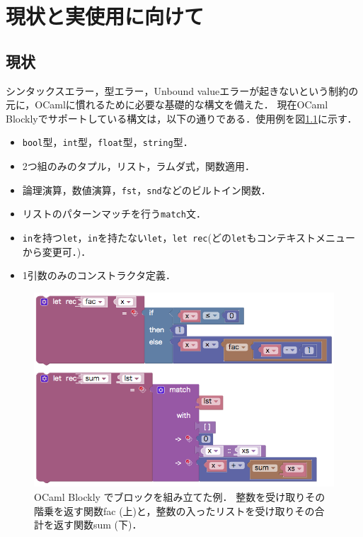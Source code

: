 \chapter {現状と実使用に向けて}\label{chap:todo}

\section {現状}\label{sub:genjo}

シンタックスエラー，型エラー，Unbound valueエラーが起きないという制約の元に，OCamlに慣れるために必要な基礎的な構文を備えた．
現在OCaml Blocklyでサポートしている構文は，以下の通りである．使用例を図\ref{fig:ocamlBlocks}に示す．
\begin{itemize}
  \item {\tt bool}型，{\tt int}型，{\tt float}型，{\tt string}型．
  \item 2つ組のみのタプル，リスト，ラムダ式，関数適用．
  \item 論理演算，数値演算，{\tt fst}，{\tt snd}などのビルトイン関数．
  \item リストのパターンマッチを行う{\tt match}文．
  \item {\tt in}を持つ{\tt let}，{\tt in}を持たない{\tt let}，{\tt let rec}(どの{\tt let}もコンテキストメニューから変更可．)．
  \item 1引数のみのコンストラクタ定義．
\end{itemize}

\begin{figure}[h]
 \centering
 \includegraphics[keepaspectratio, scale=0.4]{img/ocamlBlocks1.png}
 \caption{OCaml Blockly でブロックを組み立てた例．
整数を受け取りその階乗を返す関数fac (上)と，整数の入ったリストを受け取りその合計を返す関数sum (下)．\label{fig:ocamlBlocks}}
\end{figure}

